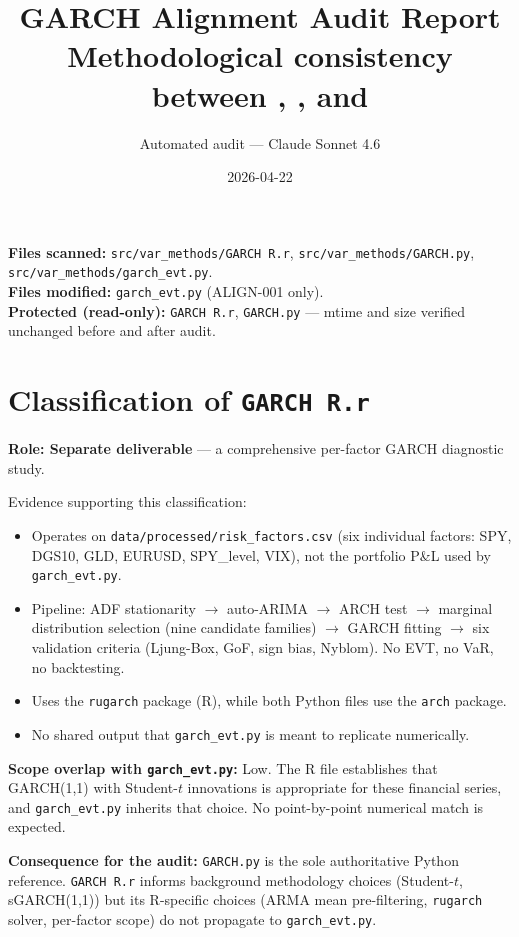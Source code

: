 \documentclass[11pt,a4paper]{article}
\title{%
  \textbf{GARCH Alignment Audit Report}\\[0.4em]
  \large Methodological consistency between \code{GARCH R.r},
         \code{GARCH.py}, and \code{garch\_evt.py}
}
\author{Automated audit --- Claude Sonnet 4.6}
\date{2026-04-22}
\newcommand{\code}[1]{\texttt{#1}}
\begin{document}
\maketitle
\tableofcontents
\bigskip

\noindent\textbf{Files scanned:}
  \code{src/var\_methods/GARCH R.r},
  \code{src/var\_methods/GARCH.py},
  \code{src/var\_methods/garch\_evt.py}.\\
\noindent\textbf{Files modified:} \code{garch\_evt.py} (ALIGN-001 only).\\
\noindent\textbf{Protected (read-only):} \code{GARCH R.r}, \code{GARCH.py}
--- mtime and size verified unchanged before and after audit.

\section{Classification of \texttt{GARCH R.r}}\label{sec:classification}

\textbf{Role: Separate deliverable} --- a comprehensive per-factor GARCH
diagnostic study.

Evidence supporting this classification:
\begin{itemize}
  \item Operates on \code{data/processed/risk\_factors.csv} (six individual
    factors: SPY, DGS10, GLD, EURUSD, SPY\_level, VIX), not the portfolio
    P\&L used by \code{garch\_evt.py}.
  \item Pipeline: ADF stationarity $\to$ auto-ARIMA $\to$ ARCH test $\to$
    marginal distribution selection (nine candidate families) $\to$ GARCH
    fitting $\to$ six validation criteria (Ljung-Box, GoF, sign bias,
    Nyblom). No EVT, no VaR, no backtesting.
  \item Uses the \code{rugarch} package (R), while both Python files use the
    \code{arch} package.
  \item No shared output that \code{garch\_evt.py} is meant to replicate
    numerically.
\end{itemize}

\textbf{Scope overlap with \code{garch\_evt.py}:} Low. The R file establishes
that GARCH(1,1) with Student-$t$ innovations is appropriate for these financial
series, and \code{garch\_evt.py} inherits that choice. No point-by-point
numerical match is expected.

\textbf{Consequence for the audit:} \code{GARCH.py} is the sole authoritative
Python reference. \code{GARCH R.r} informs background methodology choices
(Student-$t$, sGARCH(1,1)) but its R-specific choices (ARMA mean
pre-filtering, \code{rugarch} solver, per-factor scope) do not propagate to
\code{garch\_evt.py}.
\end{document}
